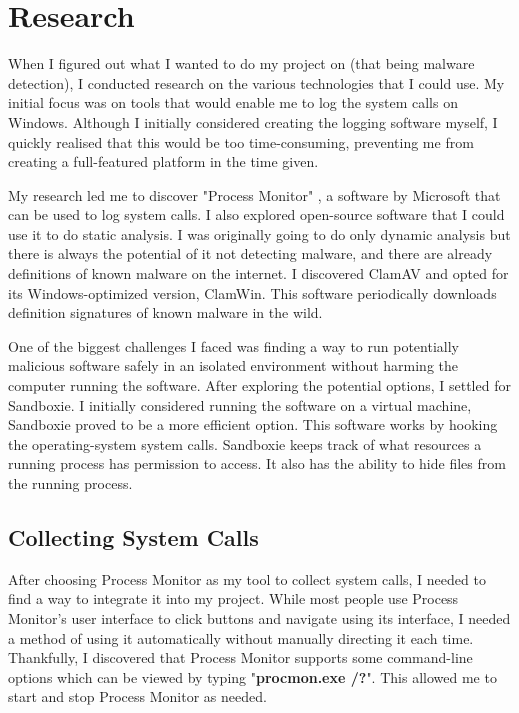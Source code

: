\section{Research}
When I figured out what I wanted to do my project on
(that being malware detection),
I conducted research on the various technologies that I could use.
My initial focus was on tools that would enable me
to log the system calls on Windows.
Although I initially considered creating the logging software myself,
I quickly realised that this would be too time-consuming,
preventing me from creating a full-featured platform in the time given.

My research led me to discover "Process Monitor" \cite{procmon},
a software by Microsoft that can be used to log system calls.
I also explored open-source software that
I could use it to do static analysis.
I was originally going to do only dynamic analysis
but there is always the potential of it not detecting malware,
and there are already definitions of known malware on the internet.
I discovered ClamAV and opted for its Windows-optimized version, ClamWin.
This software periodically downloads definition signatures
of known malware in the wild.

One of the biggest challenges I faced was finding a way to
run potentially malicious software safely
in an isolated environment without harming the
computer running the software.
After exploring the potential options,
I settled for Sandboxie. \cite{sandboxie}
I initially considered running the software on a virtual machine,
Sandboxie proved to be a more efficient option.
This software works by hooking the operating-system system calls.
Sandboxie keeps track of what resources a running
process has permission to access.
It also has the ability to hide files from the running process.

\subsection{Collecting System Calls}
After choosing Process Monitor as my tool to collect system calls,
I needed to find a way to integrate it into my project.
While most people use Process Monitor's user interface
to click buttons and navigate using its interface,
I needed a method of using it automatically
without manually directing it each time.
Thankfully, I discovered that Process Monitor supports some command-line
options which can be viewed by typing "\textbf{procmon.exe /?}".
This allowed me to start and stop Process Monitor as needed.


